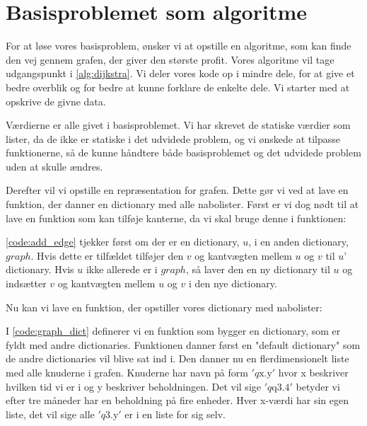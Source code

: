 \section{Basisproblemet som algoritme}
For at løse vores basisproblem, ønsker vi at opstille en algoritme, som kan finde den vej gennem grafen, der giver den største profit. Vores algoritme vil tage udgangspunkt i \autoref{alg:dijkstra}. Vi deler vores kode op i mindre dele, for at give et bedre overblik og for bedre at kunne forklare de enkelte dele. Vi starter med at opskrive de givne data. 



Værdierne er alle givet i basisproblemet. Vi har skrevet de statiske værdier som lister, da de ikke er statiske i det udvidede problem, og vi ønskede at tilpasse funktionerne, så de kunne håndtere både basisproblemet og det udvidede problem uden at skulle ændres. 

Derefter vil vi opstille en repræsentation for grafen. Dette gør vi ved at lave en funktion, der danner en dictionary med alle nabolister. Først er vi dog nødt til at lave en funktion som kan tilføje kanterne, da vi skal bruge denne i funktionen:



\autoref{code:add_edge} tjekker først om der er en dictionary, $u$, i en anden dictionary, $graph$. Hvis dette er tilfældet tilføjer den $v$ og kantvægten mellem $u$ og $v$ til  $u$' dictionary. Hvis $u$ ikke allerede er i $graph$, så laver den en ny dictionary til $u$ og indsætter $v$ og kantvægten mellem $u$ og $v$ i den nye dictionary.

Nu kan vi lave en funktion, der opstiller vores dictionary med nabolister:



I \autoref{code:graph_dict} definerer vi en funktion som bygger en dictionary, som er fyldt med andre dictionaries. Funktionen danner først en "default dictionary" som de andre dictionaries vil blive sat ind i.
Den danner nu en flerdimensionelt liste med alle knuderne i grafen. Knuderne har navn på form $'q\textrm{x.y}'$ hvor x beskriver hvilken tid vi er i og y beskriver beholdningen. Det vil sige $'q\textrm{q3.4}'$ betyder vi efter tre måneder har en beholdning på fire enheder. Hver x-værdi har sin egen liste, det vil sige alle $'q\textrm{3.y}'$ er i en liste for sig selv.

